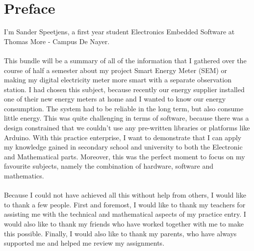\documentclass[a4paper,twoside, 12pt]{report}
\theoremstyle{break}
\begin{document}
\chapter*{Preface}
\thispagestyle{empty}
I'm Sander Speetjens, a first year student Electronics Embedded Software at Thomas More - Campus De Nayer.
\ \\ \ \\
This bundle will be a summary of all of the information that I gathered over the course of half a semester about my project Smart Energy Meter (SEM) or making my digital electricity meter more smart with a separate observation station. I had chosen this subject, because recently our energy supplier installed one of their new energy meters at home and I wanted to know our energy consumption. The system had to be reliable in the long term, but also consume little energy. This was quite challenging in terms of software, because there was a design constrained that we couldn't use any pre-written libraries or platforms like Arduino. With this practice enterprise, I want to demonstrate that I can apply my knowledge gained in secondary school and university to both the Electronic and Mathematical parts. Moreover, this was the perfect moment to focus on my favourite subjects, namely the combination of hardware, software and mathematics.
\ \\ \ \\
Because I could not have achieved all this without help from others, I would like to thank a few people. First and foremost, I would like to thank my teachers for assisting me with the technical and mathematical aspects of my practice entry.  I would also like to thank my friends who have worked together with me to make this possible.
Finally, I would also like to thank my parents, who have always supported me and helped me review my assignments.
\vfill
\eject


\clearpage{\pagestyle{empty}\cleardoublepage}


\setcounter{section}{0}
\setcounter{subsection}{0}

\parskip=-0.41mm
\tableofcontents
\thispagestyle{empty}

\vfill

\eject

\vfill
\end{document}
